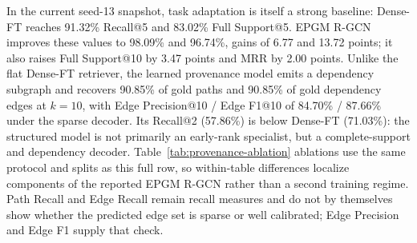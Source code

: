 \begin{table}[t]
\centering
\small
{}
\caption{Interim seed-13 synthetic 2Wiki execution-provenance retrieval
results. Quality metrics are percentages; latency is milliseconds per
query. The trainable rows will be updated after the three-seed matrix is
complete.}
\label{tab:provenance}
\end{table}

In the current seed-13 snapshot, task adaptation is itself a strong
baseline: Dense-FT reaches 91.32\% Recall@5 and 83.02\% Full Support@5.
EPGM R-GCN improves these values to 98.09\% and 96.74\%, gains of 6.77
and 13.72 points;
it also raises Full Support@10 by 3.47 points and MRR by 2.00 points.
Unlike the flat Dense-FT retriever, the learned provenance model emits a
dependency subgraph and recovers 90.85\% of gold paths and 90.85\% of
gold dependency edges at $k=10$, with Edge Precision@10 / Edge F1@10 of
84.70\% / 87.66\% under the sparse decoder. Its Recall@2 (57.86\%) is
below Dense-FT (71.03\%): the structured model is not primarily an
early-rank specialist, but a complete-support and dependency decoder.
Table~\ref{tab:provenance-ablation} ablations use the same protocol and
splits as this full row, so within-table differences localize components
of the reported EPGM R-GCN rather than a second training regime. Path
Recall and Edge Recall remain recall measures and do not by themselves
show whether the predicted edge set is sparse or well calibrated; Edge
Precision and Edge F1 supply that check.

